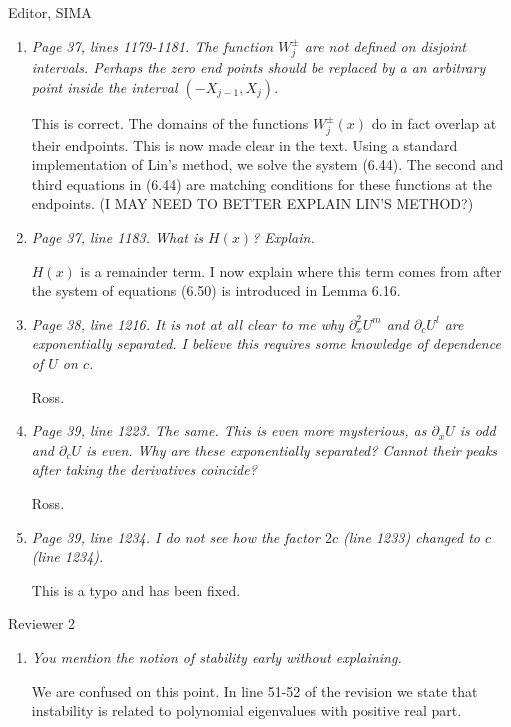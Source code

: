 \documentclass[11pt]{letter}
\begin{document}
\begin{letter}{Editor, SIMA}
\begin{enumerate}
\item \emph{Page 37, lines 1179-1181. The function $W_j^\pm$ are not defined on disjoint intervals. Perhaps the zero end points should be replaced by a an arbitrary point inside the interval $(-X_{j-1},X_j)$.}
\vspace{4mm}

This is correct. The domains of the functions $W_j^\pm(x)$ do in fact overlap at their endpoints. This is now made clear in the text. Using a standard implementation of Lin's method, we solve the system (6.44). The second and third equations in (6.44) are matching conditions for these functions at the endpoints. (I MAY NEED TO BETTER EXPLAIN LIN'S METHOD?)

\item \emph{Page 37, line 1183. What is $H(x)$? Explain.}
\vspace{4mm}

$H(x)$ is a remainder term. I now explain where this term comes from after the system of equations (6.50) is introduced in Lemma 6.16.

\item \emph{Page 38, line 1216. It is not at all clear to me why $\partial_x^2 U^m$ and $\partial_c U^l$ are exponentially separated. I believe this requires some knowledge of dependence of $U$ on $c$.}
\vspace{4mm}

Ross.

\item \emph{Page 39, line 1223. The same. This is even more mysterious, as $\partial_x U$ is odd and $\partial_c U$ is even. Why are these exponentially separated? Cannot their peaks after taking the derivatives coincide?}
\vspace{4mm}

Ross.

\item \emph{Page 39, line 1234. I do not see how the factor $2c$ (line 1233) changed to $c$ (line 1234).}
\vspace{4mm}

This is a typo and has been fixed.

\end{enumerate}

Reviewer 2
\begin{enumerate}
\item \emph{You mention the notion of stability early without explaining.}
\vspace{4mm}

We are confused on this point. In line 51-52 of the revision we state that instability is related to polynomial eigenvalues with positive real part.


\end{enumerate}
\end{letter}
\end{document}
